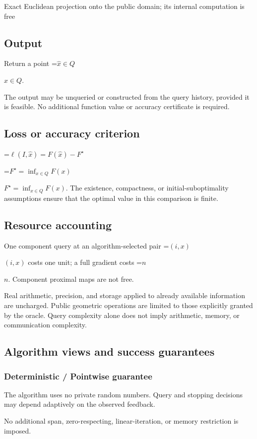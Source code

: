 \documentclass[10pt,a4paper]{article}
\newcommand{\AtlasMath}[1]{\par\begingroup\centering\setbox0=\hbox{$\displaystyle #1$}\ifdim\wd0>1.4\linewidth\typeout{ATLAS WIDE FORMULA: \the\wd0}\fi\ifdim\wd0>\linewidth\resizebox{\linewidth}{!}{\box0}\else\box0\fi\par\endgroup}
\newcommand{\AtlasInlineMath}[1]{\begingroup\setbox0=\hbox{$#1$}\ifdim\wd0>.4\linewidth\endgroup\AtlasMath{#1}\else\endgroup$#1$\fi}
\begin{document}
Exact Euclidean projection onto the public domain; its internal computation is free

\subsection{Output}
Return a point \AtlasInlineMath{\widehat x\in Q}.

The output may be unqueried or constructed from the query history, provided it is feasible. No additional function value or accuracy certificate is required.

\subsection{Loss or accuracy criterion}

\AtlasMath{\ell(I,\widehat{x})=F(\widehat{x})-F^\star}


\AtlasInlineMath{F^\star=\inf_{x\in Q}F(x)}. The existence, compactness, or initial-suboptimality assumptions ensure that the optimal value in this comparison is finite.

\subsection{Resource accounting}
One component query at an algorithm-selected pair \AtlasInlineMath{(i,x)} costs one unit; a full gradient costs \AtlasInlineMath{n}. Component proximal maps are not free.

Real arithmetic, precision, and storage applied to already available information are uncharged. Public geometric operations are limited to those explicitly granted by the oracle. Query complexity alone does not imply arithmetic, memory, or communication complexity.

\subsection{Algorithm views and success guarantees}
\subsubsection{Deterministic / Pointwise guarantee}
The algorithm uses no private random numbers. Query and stopping decisions may depend adaptively on the observed feedback.

No additional span, zero-respecting, linear-iteration, or memory restriction is imposed.
\end{document}
